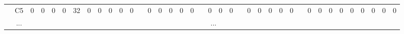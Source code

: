 \documentclass[12pt]{article}
\begin{document}
\begin{table}[!ht]
{\begin{tabular}{cccccccccccccccccccccccccccccccccccccc}
\multicolumn{1}{c|}{}                       & \multicolumn{1}{c|}{C5}  & \multicolumn{1}{c|}{0}  & \multicolumn{1}{c|}{0}  & \multicolumn{1}{c|}{0}  & \multicolumn{1}{c|}{0}  & \multicolumn{1}{c|}{32} & \multicolumn{1}{c|}{0}  & \multicolumn{1}{c|}{0}  & \multicolumn{1}{c|}{0}  & \multicolumn{1}{c|}{0}  & \multicolumn{1}{c|}{0}  & \multicolumn{1}{c|}{}                     & \multicolumn{1}{c|}{0}  & \multicolumn{1}{c|}{0}  & \multicolumn{1}{c|}{0}  & \multicolumn{1}{c|}{0}  & \multicolumn{1}{c|}{0}  & \multicolumn{1}{c|}{}                     & \multicolumn{1}{c|}{0}  & \multicolumn{1}{c|}{0}  & \multicolumn{1}{c|}{0}  & \multicolumn{1}{c|}{}                     & \multicolumn{1}{c|}{0}  & \multicolumn{1}{c|}{0}  & \multicolumn{1}{c|}{0}  & \multicolumn{1}{c|}{0}  & \multicolumn{1}{c|}{0}  & \multicolumn{1}{c|}{}                     & \multicolumn{1}{c|}{0}  & \multicolumn{1}{c|}{0}  & \multicolumn{1}{c|}{0}  & \multicolumn{1}{c|}{0}  & \multicolumn{1}{c|}{0}  & \multicolumn{1}{c|}{0}  & \multicolumn{1}{c|}{0}  & \multicolumn{1}{c|}{0}  & \multicolumn{1}{c|}{0}  \\ \cline{2-12} \cline{14-18} \cline{20-22} \cline{24-28} \cline{30-38} 
\multicolumn{1}{c|}{}                       & \multicolumn{1}{c|}{...} & \multicolumn{36}{c|}{...}                                                                                                                                                                                                                                                                                                                                                                                                                                                                                                                                                                                                                                                                                                                                                                                                                                                                                                                                                                                                                     \\ \cline{2-12} \cline{14-18} \cline{20-22} \cline{24-28} \cline{30-38} 

\end{tabular}}
\end{table}
\end{document}

